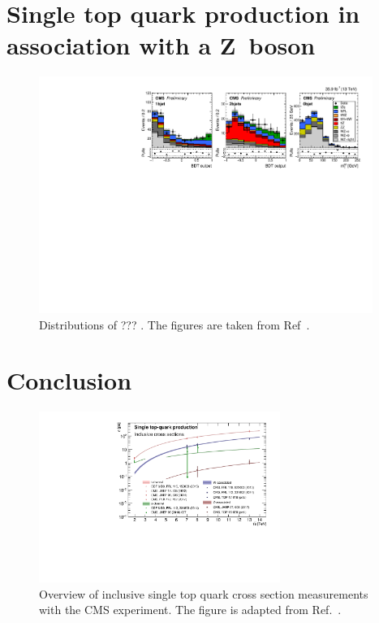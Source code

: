 \documentclass[12pt]{article}
\begin{document}
\section{Single top quark production in association with a Z~boson}

\begin{figure}[!htb]
\begin{center}
\includegraphics[width=0.97\textwidth]{tZq-fit.pdf}
\caption{Distributions of ??? . The figures are taken from Ref~\cite{tZq-inc}.}
\end{center}
\end{figure}

\section{Conclusion}

\begin{figure}[!htb]
\begin{center}
\includegraphics[width=0.7\textwidth]{singletopSep2017_noATLAS.pdf}
\caption{Overview of inclusive single top quark cross section measurements with the CMS experiment. The figure is adapted from Ref.~\cite{Giammanco}.}
\end{center}
\end{figure}
\end{document}
